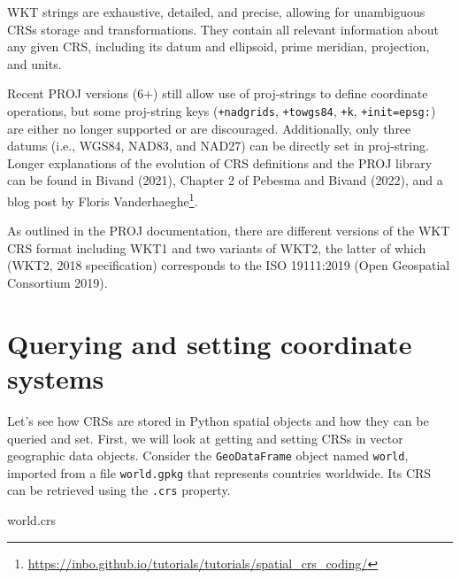 \documentclass[
  letterpaper,
]{krantz}
\newenvironment{Shaded}{\begin{snugshade}}{\end{snugshade}}
\newcommand{\NormalTok}[1]{\textcolor[rgb]{0.00,0.23,0.31}{#1}}
\begin{document}
WKT strings are exhaustive, detailed, and precise, allowing for
unambiguous CRSs storage and transformations. They contain all relevant
information about any given CRS, including its datum and ellipsoid,
prime meridian, projection, and units.

Recent PROJ versions (6+) still allow use of proj-strings to define
coordinate operations, but some proj-string keys (\texttt{+nadgrids},
\texttt{+towgs84}, \texttt{+k}, \texttt{+init=epsg:}) are either no
longer supported or are discouraged. Additionally, only three datums
(i.e., WGS84, NAD83, and NAD27) can be directly set in proj-string.
Longer explanations of the evolution of CRS definitions and the PROJ
library can be found in Bivand (2021), Chapter 2 of Pebesma and Bivand
(2022), and a blog post by Floris Vanderhaeghe\footnote{\url{https://inbo.github.io/tutorials/tutorials/spatial_crs_coding/}}.

\begin{tcolorbox}[enhanced jigsaw, breakable, title=\textcolor{quarto-callout-note-color}{\faInfo}\hspace{0.5em}{Note}, arc=.35mm, opacitybacktitle=0.6, left=2mm, colback=white, bottomrule=.15mm, bottomtitle=1mm, toptitle=1mm, colframe=quarto-callout-note-color-frame, leftrule=.75mm, rightrule=.15mm, toprule=.15mm, titlerule=0mm, opacityback=0, colbacktitle=quarto-callout-note-color!10!white, coltitle=black]

As outlined in the PROJ documentation, there are different versions of
the WKT CRS format including WKT1 and two variants of WKT2, the latter
of which (WKT2, 2018 specification) corresponds to the ISO 19111:2019
(Open Geospatial Consortium 2019).

\end{tcolorbox}

\section{Querying and setting coordinate
systems}\label{sec-querying-and-setting-coordinate-systems}

Let's see how CRSs are stored in Python spatial objects and how they can
be queried and set. First, we will look at getting and setting CRSs in
vector geographic data objects. Consider the \texttt{GeoDataFrame}
object named \texttt{world}, imported from a file \texttt{world.gpkg}
that represents countries worldwide. Its CRS can be retrieved using the
\texttt{.crs} property.

\begin{Shaded}
\begin{Highlighting}[]
\NormalTok{world.crs}
\end{Highlighting}
\end{Shaded}
\end{document}
